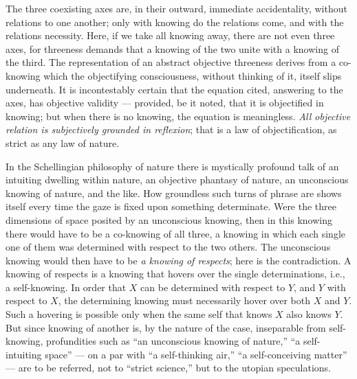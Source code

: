 \documentclass[12pt,a4paper]{book}
\begin{document}
The three coexisting axes are, in their outward, immediate accidentality, without
relations to one another; only with knowing do the relations come, and with the
relations necessity. Here, if we take all knowing away, there are not even three
axes, for threeness demands that a knowing of the two unite with a knowing of the
third. The representation of an abstract objective threeness derives from a
co-knowing which the objectifying consciousness, without thinking of it, itself
slips underneath. It is incontestably certain that the equation cited, answering
to the axes,
has objective validity --- provided, be it noted, that it is objectified in
knowing; but when there is no knowing, the equation is meaningless. \emph{All
objective relation is subjectively grounded in reflexion}; that is a law of
objectification, as strict as any law of nature.

In the Schellingian philosophy of nature there is mystically profound talk of an
intuiting dwelling within nature, an objective phantasy of nature, an unconscious
knowing of nature, and the like. How groundless such turns of phrase are shows
itself every time the gaze is fixed upon something determinate. Were the three
dimensions of space posited by an unconscious knowing, then in this knowing there
would have to be a co-knowing of all three, a knowing in which each single one of
them was determined with respect to the two others. The unconscious knowing would
then have to be \emph{a knowing of respects}; here is the contradiction. A knowing
of respects is a knowing that hovers over the single determinations, i.e., a
self-knowing. In order that $X$ can be determined with respect to $Y$, and $Y$
with respect to $X$, the determining knowing must necessarily hover over both $X$
and $Y$. Such a hovering is possible only when the same self that knows $X$ also
knows $Y$. But since knowing of another is, by the nature of the case,
inseparable from self-knowing, profundities such as ``an unconscious knowing of
nature,'' ``a self-intuiting space'' --- on a par with ``a self-thinking air,'' ``a
self-conceiving matter'' --- are to be referred, not to ``strict science,'' but to
the utopian speculations.
\end{document}
